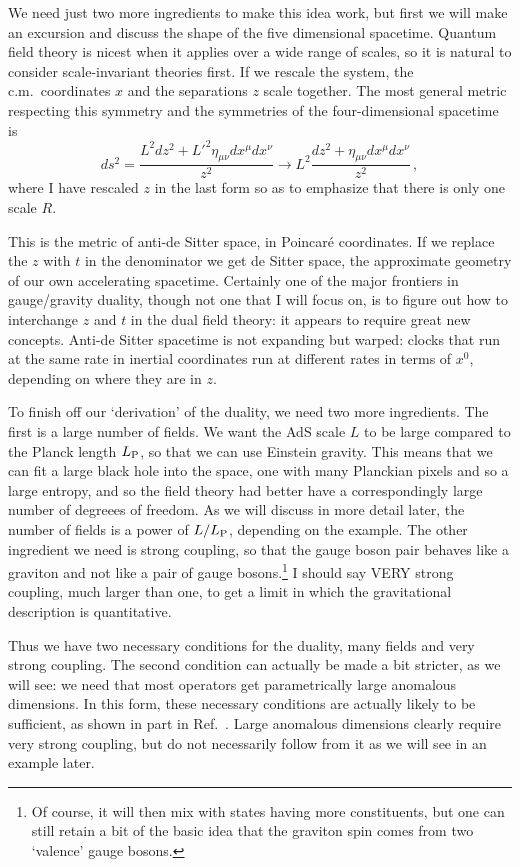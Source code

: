 \documentclass[12pt]{article}
\begin{document}
We need just two more ingredients to make this idea work, but first we will make an excursion and discuss the shape of the five dimensional spacetime.  Quantum field theory is nicest when it applies over a wide range of scales, so it is natural to consider scale-invariant theories first.  If we rescale the system, the c.m.\ coordinates $x$ and the separations $z$ scale together.  The most general metric respecting this symmetry and the symmetries of the four-dimensional spacetime is
\begin{equation}
ds^2 = \frac{L^2 dz^2 +  L'^2 \eta_{\mu\nu} dx^\mu dx^\nu}{z^2} \to L^2 \frac{dz^2 +  \eta_{\mu\nu} dx^\mu dx^\nu}{z^2} \,,
\label{adsmet}
\end{equation}  
where I have rescaled $z$ in the last form so as to emphasize that there is only one scale $R$.

This is the metric of anti-de Sitter space, in Poincar\'e coordinates.  If we replace the $z$ with $t$ in the denominator we get de Sitter space, the approximate geometry of our own accelerating spacetime.  Certainly one of the major frontiers in gauge/gravity duality, though not one that I will focus on, is to figure out how to interchange $z$ and $t$ in the dual field theory: it appears to require great new concepts.  Anti-de Sitter spacetime is not expanding but warped: clocks that run at the same rate in inertial coordinates run at different rates in terms of $x^0$, depending on where they are in $z$. 

To finish off our `derivation' of the duality, we need two more ingredients.  The first is a large number of fields.  We want the AdS scale $L$ to be large compared to the Planck length $L_{\rm P}$, so that we can use Einstein gravity.  This means that we can fit a large black hole into the space, one with many Planckian pixels and so a large entropy, and so the field theory had better have a correspondingly large number of degreees of freedom.  As we will discuss in more detail later, the number of fields is a power of $L/L_{\rm P}$, depending on the example.  The other ingredient we need is strong coupling, so that the gauge boson pair behaves like a graviton and not like a pair of gauge bosons.\footnote{Of course, it will then mix with states having more constituents, but one can still retain a bit of the basic idea that the graviton spin comes from two `valence' gauge bosons.}  I should say VERY strong coupling, much larger than one, to get a limit in which the gravitational description is quantitative.  

Thus we have two necessary conditions for the duality, many fields and very strong coupling.  The second condition can actually be made a bit stricter, as we will see: we need that most operators get parametrically large anomalous dimensions.  In this form, these necessary conditions are actually likely to be sufficient, as shown in part in Ref.~\cite{Heemskerk:2009pn}.  Large anomalous dimensions clearly require very strong coupling, but do not necessarily follow from it as we will see in an example later.
\end{document}
